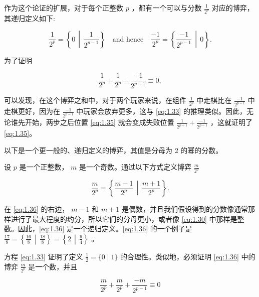作为这个论证的扩展，对于每个正整数 \(p\) ，都有一个可以与分数 \(\frac{1}{{2}^{p}}\) 对应的博弈，其递归定义如下:

\begin{equation}
\label{eq:1.34}
\frac{1}{{2}^{p}} = \left\{0 \,\middle|\, \frac{1}{{2}^{p - 1}}\right\}
\quad\text{and hence}\quad
\frac{-1}{{2}^{p}} = \left\{\frac{-1}{{2}^{p - 1}} \,\middle|\, 0\right\}.
\end{equation}

为了证明

\begin{equation}
\label{eq:1.35}
\frac{1}{{2}^{p}} + \frac{1}{{2}^{p}} + \frac{-1}{{2}^{p - 1}} \equiv  0, 
\end{equation}

可以发现，在这个博弈之和中，对于两个玩家来说，在组件 \(\frac{1}{{2}^{p}}\) 中走棋比在 \(\frac{-1}{{2}^{p - 1}}\) 中走棋更好，因为在 \(\frac{-1}{{2}^{p - 1}}\) 中玩家会放弃更多，这与 \eqref{eq:1.33} 的推理类似。因此，无论谁先开始，两步之后位置 \eqref{eq:1.35} 就会变成失败位置 \(\frac{1}{{2}^{p - 1}} + \frac{-1}{{2}^{p - 1}}\) ，这就证明了 \eqref{eq:1.35}。

以下是一个更一般的、递归定义的博弈，其值是分母为 2 的幂的分数。

\begin{definition}\label{def:1.19}设 \(p\) 是一个正整数， \(m\) 是一个奇数。通过以下方式定义博弈 \(\frac{m}{{2}^{p}}\)

\begin{equation}
\label{eq:1.36}
\frac{m}{{2}^{p}} = \left\{\frac{m - 1}{{2}^{p}} \,\middle|\, \frac{m + 1}{{2}^{p}}\right\}.
\end{equation}
\end{definition}


在 \eqref{eq:1.36} 的右边， \(m - 1\) 和 \(m + 1\) 是偶数，并且我们假设得到的分数像通常那样进行了最大程度的约分，所以它们的分母更小，或者像 \eqref{eq:1.30} 中那样是整数。因此，\eqref{eq:1.36} 是一个递归定义。\eqref{eq:1.36} 的一个例子是 \(\frac{17}{8} = \left\{\frac{16}{8}\,\middle|\,\frac{18}{8}\right\} = \left\{2\,\middle|\,\frac{9}{4}\right\}\) 。

方程 \eqref{eq:1.33} 证明了定义 \(\frac{1}{2} = \{ 0 \mid  1\}\) 的合理性。类似地，必须证明 \eqref{eq:1.36} 中的博弈 \(\frac{m}{{2}^{p}}\) 是一个数，并且

\begin{equation}
\label{eq:1.37}
\frac{m}{{2}^{p}} + \frac{m}{{2}^{p}} + \frac{-m}{{2}^{p - 1}} \equiv  0 
\end{equation}

